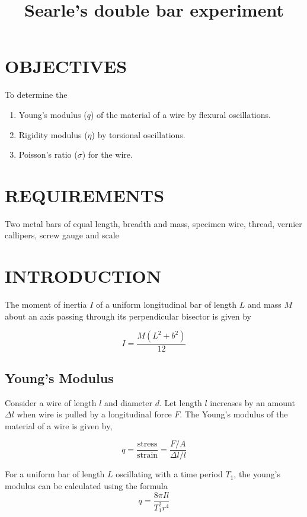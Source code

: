 \documentclass[12pt,a4paper]{article}
\title{Searle's double bar experiment}
\begin{document}
	\maketitle
	
	\section{OBJECTIVES}
		To determine the 
			\begin{enumerate}
				\item Young's modulus ($q$) of the material of a wire by flexural oscillations.
				\item Rigidity modulus ($\eta$) by torsional oscillations. 
				\item Poisson's ratio ($\sigma$) for the wire.
			\end{enumerate}
	
	\section{REQUIREMENTS}
		Two metal bars of equal length, breadth and mass, specimen wire, thread, vernier callipers, screw gauge and scale
		
	\section{INTRODUCTION}
		
		The moment of inertia $I$ of a uniform longitudinal bar of length $L$ and mass $M$ about an axis passing through its perpendicular bisector is given by
		
			
			\begin{equation}
				I = \dfrac{M\left(L^2 + b^2\right)}{12}  \label{eq:1}
			\end{equation}
		
		\subsection{Young's Modulus}
			Consider a wire of length $l$ and diameter $d$. Let length $l$ increases by an amount $\Delta l$ when wire is pulled by a longitudinal force $F$. The Young's modulus of the material of a wire is given by, 
			
			\[q = \dfrac{\text{stress}}{\text{strain}}=\dfrac{F/A}{\Delta l/l}\]	
				
			For a uniform bar of length $L$ oscillating with a time period $T_{1}$, the young's modulus can be calculated using the formula
				\begin{equation}
					q=\dfrac{8\pi Il}{T^{2}_{1}r^{4}}
				\end{equation}
				
\end{document}
